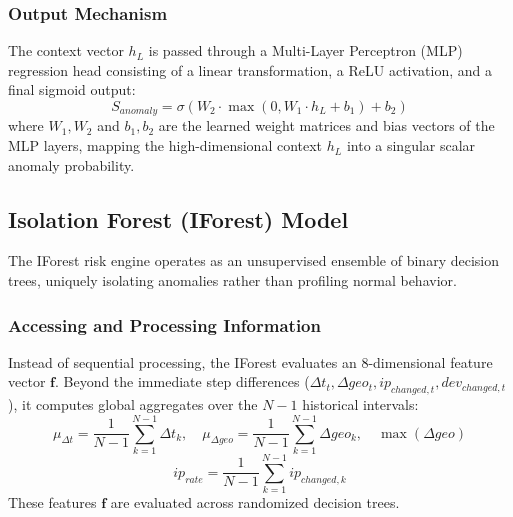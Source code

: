 \documentclass[pdflatex,sn-mathphys-num]{sn-jnl}
\theoremstyle{thmstyleone}%
\theoremstyle{thmstyletwo}%
\theoremstyle{thmstylethree}%
\begin{document}
\subsubsection{Output Mechanism}
The context vector $h_L$ is passed through a Multi-Layer Perceptron (MLP) regression head consisting of a linear transformation, a ReLU activation, and a final sigmoid output:
\begin{equation}
S_{anomaly} = \sigma(W_2 \cdot \max(0, W_1 \cdot h_L + b_1) + b_2) \tag{18}
\end{equation}
where $W_1, W_2$ and $b_1, b_2$ are the learned weight matrices and bias vectors of the MLP layers, mapping the high-dimensional context $h_L$ into a singular scalar anomaly probability.

\subsection{Isolation Forest (IForest) Model}
The IForest risk engine operates as an unsupervised ensemble of binary decision trees, uniquely isolating anomalies rather than profiling normal behavior.

\subsubsection{Accessing and Processing Information}
Instead of sequential processing, the IForest evaluates an 8-dimensional feature vector $\mathbf{f}$. Beyond the immediate step differences ($\Delta t_t, \Delta geo_t, ip_{changed, t}, dev_{changed, t}$), it computes global aggregates over the $N-1$ historical intervals:
\begin{equation}
\mu_{\Delta t} = \frac{1}{N-1} \sum_{k=1}^{N-1} \Delta t_k, \quad \mu_{\Delta geo} = \frac{1}{N-1} \sum_{k=1}^{N-1} \Delta geo_k, \quad \max(\Delta geo) \tag{19}
\end{equation}
\begin{equation}
ip_{rate} = \frac{1}{N-1} \sum_{k=1}^{N-1} ip_{changed, k} \tag{20}
\end{equation}
These features $\mathbf{f}$ are evaluated across randomized decision trees.
\end{document}
